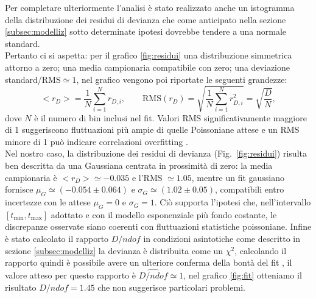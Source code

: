 \documentclass[10pt,a4paper]{article}
\begin{document}
\begin{flushleft}
Per completare ulteriormente l'analisi è stato realizzato anche un istogramma della distribuzione dei residui di devianza che come anticipato nella sezione \ref{subsec:modelliz} sotto determinate ipotesi dovrebbe tendere a una normale standard.\\
Pertanto ci si aspetta: per il grafico \ref{fig:residui} una distribuzione simmetrica attorno a zero; una media campionaria compatibile con zero; una deviazione standard/RMS$\simeq1$, nel grafico vengono poi riportate le seguenti grandezze:
\begin{equation}
<r_D>=\frac{1}{N}\sum_{i=1}^{N} r_{D,i},
\qquad
\mathrm{RMS}(r_D)=\sqrt{\frac{1}{N}\sum_{i=1}^{N} r_{D,i}^2}
=\sqrt{\frac{D}{N}},
\end{equation}
dove $N$ è il numero di bin inclusi nel fit. 
Valori RMS significativamente maggiore di 1 suggeriscono fluttuazioni più ampie di quelle Poissoniane attese e un RMS minore di 1 può indicare correlazioni overfitting .\\
Nel nostro caso, la distribuzione dei residui di devianza (Fig.~\ref{fig:residui}) risulta ben descritta da una Gaussiana centrata in prossimità di zero: la media campionaria è $<r_D>\simeq -0.035$ e l’RMS $\simeq 1.05$, mentre un fit gaussiano fornisce $\mu_G \simeq (-0.054\pm 0.064)$ e $\sigma_G \simeq (1.02\pm 0.05)$, compatibili entro incertezze con le attese $\mu_G=0$ e $\sigma_G=1$. Ciò supporta l’ipotesi che, nell’intervallo $[t_{\min},t_{\max}]$ adottato e con il modello esponenziale più fondo costante, le discrepanze osservate siano coerenti con fluttuazioni statistiche poissoniane.
Infine è stato calcolato il rapporto $D/ndof$ in condizioni asintotiche come descritto in sezione \ref{subsec:modelliz} la devianza è distribuita come un $\chi^2$, calcolando il rapporto quindi è possibile avere un ulteriore conferma della bontà del fit , il valore atteso per questo rapporto è $\hat{D/ndof}\simeq 1$, nel grafico \ref{fig:fit} otteniamo il risultato $D/ndof=1.45$ che non suggerisce particolari problemi.


\end{flushleft}
\end{document}
